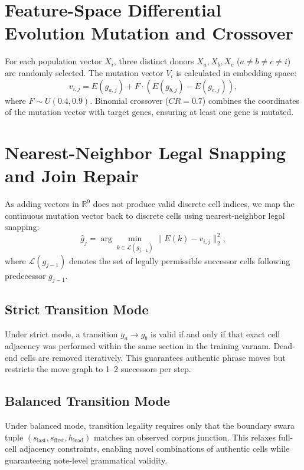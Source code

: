 \documentclass[12pt,a4paper]{report}
\begin{document}
\section{Feature-Space Differential Evolution Mutation and Crossover}
For each population vector $X_i$, three distinct donors $X_a, X_b, X_c$ ($a \neq b \neq c \neq i$) are randomly selected. The mutation vector $V_i$ is calculated in embedding space:
\begin{equation}
 v_{i,j} = E(g_{a,j}) + F \cdot \left( E(g_{b,j}) - E(g_{c,j}) \right),
 \label{eq:mutation}
\end{equation}
where $F \sim U(0.4, 0.9)$. Binomial crossover ($CR = 0.7$) combines the coordinates of the mutation vector with target genes, ensuring at least one gene is mutated.

\section{Nearest-Neighbor Legal Snapping and Join Repair}
As adding vectors in $\mathbb{R}^9$ does not produce valid discrete cell indices, we map the continuous mutation vector back to discrete cells using nearest-neighbor legal snapping:
\begin{equation}
 \hat{g}_j = \arg\min_{k \in \mathcal{L}(g_{j-1})} \| E(k) - v_{i,j} \|_2^2,
 \label{eq:snap}
\end{equation}
where $\mathcal{L}(g_{j-1})$ denotes the set of legally permissible successor cells following predecessor $g_{j-1}$.

\subsection{Strict Transition Mode}
Under strict mode, a transition $g_a \rightarrow g_b$ is valid if and only if that exact cell adjacency was performed within the same section in the training varnam. Dead-end cells are removed iteratively. This guarantees authentic phrase moves but restricts the move graph to 1--2 successors per step.

\subsection{Balanced Transition Mode}
Under balanced mode, transition legality requires only that the boundary swara tuple $(s_{\text{last}}, s_{\text{first}}, h_{\text{lead}})$ matches an observed corpus junction. This relaxes full-cell adjacency constraints, enabling novel combinations of authentic cells while guaranteeing note-level grammatical validity.
\end{document}
